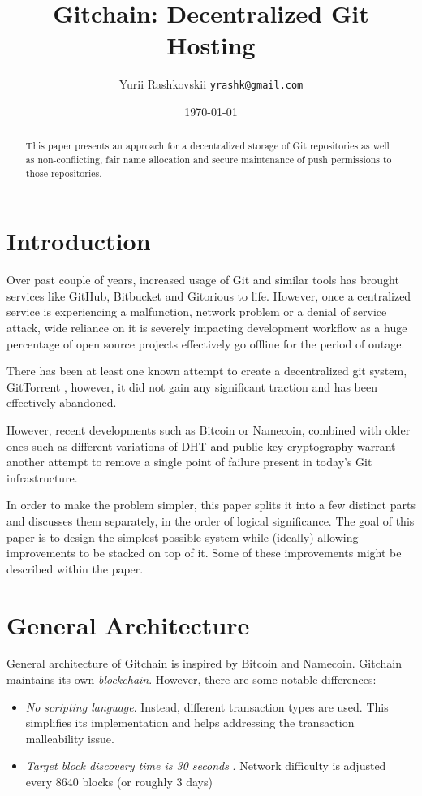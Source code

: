 \documentclass[a4paper]{article}
\title{Gitchain: Decentralized Git Hosting}
\author{Yurii Rashkovskii \texttt{yrashk@gmail.com}}
\date{\today}
\begin{document}
\maketitle

\begin{abstract}
This paper presents an approach for a decentralized storage of Git repositories as well as non-conflicting, fair name allocation and secure maintenance of push permissions to those repositories.
\end{abstract}

\section{Introduction}

Over past couple of years, increased usage of Git and similar tools has brought services like GitHub, Bitbucket and Gitorious to life. However, once a centralized service is experiencing a malfunction, network problem or a denial of service attack, wide reliance on it is severely impacting development workflow as a huge percentage of open source projects effectively go offline for the period of outage.

There has been at least one known attempt to create a decentralized git system, GitTorrent \cite{fonseca06}, however, it did not gain any significant traction and has been effectively abandoned.

However, recent developments such as Bitcoin or Namecoin, combined with older ones such as different variations of DHT and public key cryptography warrant another attempt to remove a single point of failure present in today's Git infrastructure.

In order to make the problem simpler, this paper splits it into a few distinct parts and discusses them separately, in the order of logical significance. The goal of this paper is to design the simplest possible system while (ideally) allowing improvements to be stacked on top of it. Some of these improvements might be described within the paper.

\section{General Architecture}

General architecture of Gitchain is inspired by Bitcoin and Namecoin. Gitchain maintains its own \emph{blockchain}. However, there are some notable differences:

\begin{itemize}
\item \emph{No scripting language}. Instead, different transaction types are used. This simplifies its implementation and helps addressing the transaction malleability \cite{txnmal} issue.
\item \emph{Target block discovery time is 30 seconds }. Network difficulty is adjusted every 8640 blocks (or roughly 3 days) 
\end{itemize}
\end{document}
